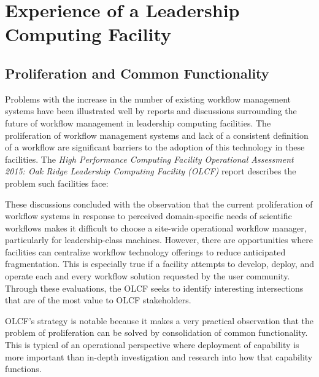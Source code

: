 \section{Experience of a Leadership Computing Facility}\label{olcf}

\subsection{Proliferation and Common Functionality} \label{commonFunc}

Problems with the increase in the number of existing workflow management
systems have been illustrated well by reports and discussions surrounding the
future of workflow management in leadership computing facilities. The
proliferation of workflow management systems and lack of a consistent
definition of a workflow are significant barriers to the adoption of this
technology in these facilities. The \textit{High Performance Computing Facility
Operational Assessment 2015: Oak Ridge Leadership Computing Facility (OLCF)}
report \cite{barker_scientific_2007} describes the problem such
facilities face:  \begin{displayquote} These discussions concluded with the
observation that the current proliferation of workflow systems in response to
perceived domain-specific needs of scientific workflows makes it difficult to
choose a site-wide operational workflow manager, particularly for
leadership-class machines. However, there are opportunities where facilities
can centralize workflow technology offerings to reduce anticipated
fragmentation. This is especially true if a facility attempts to develop,
deploy, and operate each and every workflow solution requested by the user
community. Through these evaluations, the OLCF seeks to identify interesting
intersections that are of the most value to OLCF stakeholders.
\end{displayquote}  OLCF's strategy is notable because it makes a
very practical observation that the problem of proliferation can be solved by
consolidation of common functionality. This is typical of an operational
perspective where deployment of capability is more important than in-depth
investigation and research into how that capability functions.